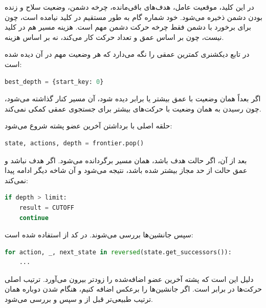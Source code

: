 \documentclass[10.5pt]{exam}
\begin{document}
در این کلید، موقعیت عامل، هدف‌های باقی‌مانده، چرخه دشمن، وضعیت سلاح و زنده بودن دشمن ذخیره می‌شود. خود شماره گام به طور مستقیم در کلید نیامده است، چون برای برخورد با دشمن فقط چرخه حرکت دشمن مهم است. هزینه مسیر هم در کلید نیست، چون
بر اساس عمق و تعداد حرکت کار می‌کند، نه بر اساس هزینه.

در تابع
دیکشنری
کمترین عمقی را نگه می‌دارد که هر وضعیت مهم در آن دیده شده است:

\begin{latin}
\begin{lstlisting}[language=Python]
best_depth = {start_key: 0}
\end{lstlisting}
\end{latin}

اگر بعداً همان وضعیت با عمق بیشتر یا برابر دیده شود، آن مسیر کنار گذاشته می‌شود، چون رسیدن به همان وضعیت با حرکت‌های بیشتر برای جستجوی عمقی کمکی نمی‌کند.

حلقه اصلی با برداشتن آخرین عضو پشته شروع می‌شود:

\begin{latin}
\begin{lstlisting}[language=Python]
state, actions, depth = frontier.pop()
\end{lstlisting}
\end{latin}

بعد از آن، اگر حالت هدف باشد، همان مسیر
برگردانده می‌شود. اگر هدف نباشد و عمق حالت از حد مجاز بیشتر شده باشد، نتیجه
می‌شود و آن شاخه دیگر ادامه پیدا نمی‌کند:

\begin{latin}
\begin{lstlisting}[language=Python]
if depth > limit:
    result = CUTOFF
    continue
\end{lstlisting}
\end{latin}

سپس جانشین‌ها بررسی می‌شوند. در کد از
استفاده شده است:

\begin{latin}
\begin{lstlisting}[language=Python]
for action, _, next_state in reversed(state.get_successors()):
    ...
\end{lstlisting}
\end{latin}

دلیل
این است که پشته آخرین عضو اضافه‌شده را زودتر بیرون می‌آورد. ترتیب اصلی حرکت‌ها در
برابر
است. اگر جانشین‌ها را برعکس اضافه کنیم، هنگام
شدن دوباره همان ترتیب طبیعی‌تر
قبل از
و سپس
و
بررسی می‌شود.
\end{document}
